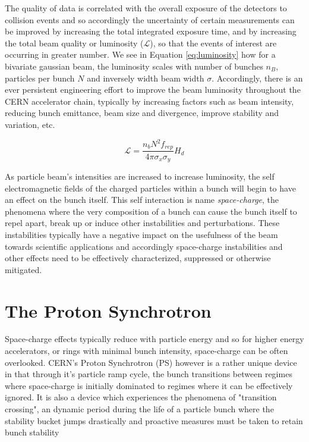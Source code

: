 The quality of data is correlated with the overall exposure of the detectors to collision events and so accordingly the uncertainty of certain measurements can be improved by increasing the total integrated exposure time, and by increasing the total beam quality or luminosity ($\mathcal{L}$), so that the events of interest are occurring in greater number. We see in Equation \ref{eq:luminosity} how for a bivariate gaussian beam, the luminosity scales with number of bunches $n_B$, particles per bunch $N$ and inversely width beam width $\sigma$. Accordingly, there is an ever persistent engineering effort to improve the beam luminosity throughout the CERN accelerator chain, typically by increasing factors such as beam intensity, reducing bunch emittance, beam size and divergence, improve stability and variation, etc.

\begin{equation}
    \mathcal{L} = \frac{n_bN^2f_{rep}}{4\pi\sigma_x\sigma_y}H_d
    \label{eq:luminosity}
\end{equation}

As particle beam's intensities are increased to increase luminosity, the self electromagnetic fields of the charged particles within a bunch will begin to have an effect on the bunch itself. This self interaction is name \textit{space-charge}, the phenomena where the very composition of a bunch can cause the bunch itself to repel apart, break up or induce other instabilities and perturbations. These instabilities typically have a negative impact on the usefulness of the beam towards scientific applications and accordingly space-charge instabilities and other effects need to be effectively characterized, suppressed or otherwise mitigated.

\section{The Proton Synchrotron}

Space-charge effects typically reduce with particle energy and so for higher energy accelerators, or rings with minimal bunch intensity, space-charge can be often overlooked. CERN's Proton Synchrotron (PS) however is a rather unique device in that through it's particle ramp cycle, the bunch transitions between regimes where space-charge is initially dominated to regimes where it can be effectively ignored. It is also a device which experiences the phenomena of "transition crossing", an dynamic period during the life of a particle bunch where the stability bucket jumps drastically and proactive measures must be taken to retain bunch stability

